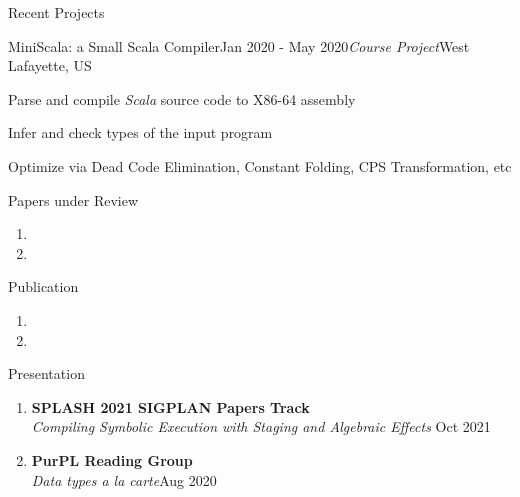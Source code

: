 \documentclass{resume} %
\begin{document}
\begin{rSection}{Recent Projects}
\begin{rSubsection}{MiniScala: a Small Scala Compiler}{Jan 2020 - May 2020}{\textit{Course Project}}{West Lafayette, US}
\item Parse and compile \textit{Scala} source code to X86-64 assembly
\item Infer and check types of the input program
\item Optimize via Dead Code Elimination, Constant Folding, CPS Transformation, etc

\end{rSubsection}


\end{rSection}

\begin{rSection}{Papers under Review}
    \begin{enumerate}
        \item {}
        \item {}
    \end{enumerate}
\end{rSection}

\begin{rSection}{Publication}
\begin{enumerate}
    \item {}
    \item {}
\end{enumerate}



\end{rSection}

\begin{rSection}{Presentation}
\begin{enumerate}
\item \textbf{SPLASH 2021 SIGPLAN Papers Track}\\
\textit{Compiling Symbolic Execution with Staging and Algebraic Effects} \hfill Oct 2021
\item \textbf{PurPL Reading Group} \\
\textit{Data types a la carte}\hfill Aug 2020
\end{enumerate}


\end{rSection}
\end{document}
